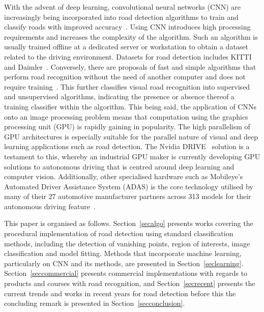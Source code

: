 With the advent of deep learning, convolutional neural networks (CNN) are increasingly being incorporated into road detection algorithms to train and classify roads with improved accuracy~\cite{brust_convolutional_2015,p._y._shinzato_fast_2012,abbas_novel_2016}. Using CNN introduces high processing requirements and increases the complexity of the algorithm. Such an algorithm is usually trained offline at a dedicated server or workstation to obtain a dataset related to the driving environment. Datasets for road detection includes KITTI~\cite{geiger_vision_2013} and Daimler~\cite{scharwachter_efficient_2013}. Conversely, there are proposals of fast and simple algorithms that perform road recognition without the need of another computer and does not require training~\cite{f._janda_road_2013,cristoforis_real-time_2016}. This further classifies visual road recognition into supervised and unsupervised algorithms, indicating the presence or absence thereof a training classifier within the algorithm. This being said, the application of CNNs onto an image processing problem means that computation using the graphics processing unit (GPU) is rapidly gaining in popularity. The high parallelism of GPU architectures is especially suitable for the parallel nature of visual and deep learning applications such as road detection. The Nvidia DRIVE~\cite{nvidia_corporation_nvidia_2017-1} solution is a testament to this, whereby an industrial GPU maker is currently developing GPU solutions to autonomous driving that is centred around deep learning and computer vision. Additionally, other specialised hardware such as Mobileye's Automated Driver Assistance System (ADAS) is the core technology utilised by many of their 27 automotive manufacturer partners across 313 models for their autonomous driving feature~\cite{mobileye_mobileye_2016}.



This paper is organised as follows. Section~\ref{secalgo} presents works covering the procedural implementation of road detection using standard classification methods, including the detection of vanishing points, region of interests, image classification and model fitting. Methods that incorporate machine learning, particularly on CNN and its methods, are presented in Section~\ref{seclearning}. Section~\ref{seccommercial} presents commercial implementations with regards to products and courses with road recognition, and Section~\ref{secrecent} presents the current trends and works in recent years for road detection before this the concluding remark is presented in Section~\ref{secconclusion}.  

